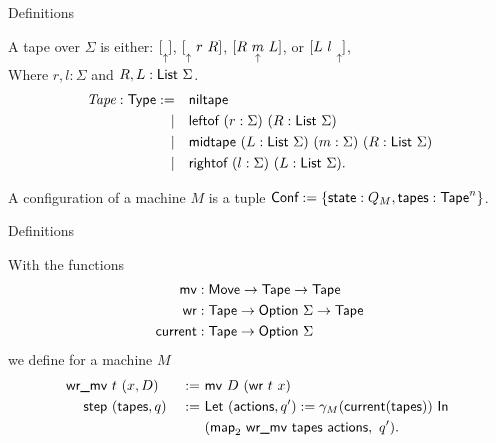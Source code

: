 \begin{frame}{Definitions}
  \begin{definition}[Tape]
    A tape over $\Sigma$ is either:
    $ [ \underset{\uparrow}{} ]$, $[ \underset{\uparrow}{}~r~R ]$, $[ R~\underset{\uparrow}{m}~L ]$, or $[ L~l~\underset{\uparrow}{} ]$,\\
    Where $r,l : \Sigma$ and $R,L : \textsf{List}~\Sigma$.
    \pause
    \begin{alignat*}{2}
      \emph{Tape}:\textsf{Type} := \quad & \textsf{niltape} \\
      | \quad & \textsf{leftof}  ~ (r:\Sigma) ~ (R:\textsf{List}~\Sigma) \\
      | \quad & \textsf{midtape} ~ (L:\textsf{List}~\Sigma) ~ (m:\Sigma) ~ (R:\textsf{List}~\Sigma) \\
      | \quad & \textsf{rightof} ~ (l:\Sigma) ~ (L:\textsf{List}~\Sigma).
    \end{alignat*}
  \end{definition}
  \pause
  \begin{definition}[Configuration]
    A configuration of a machine $M$ is a tuple $\textsf{Conf} := \{\textsf{state}:Q_M, \textsf{tapes}:\textsf{Tape}^n\}$.
  \end{definition}
\end{frame}

\begin{frame}{Definitions}
  \begin{definition}
    With the functions
    \begin{alignat*}{2}
      \textsf{mv}      & : \textsf{Move} \rightarrow \textsf{Tape} \rightarrow \textsf{Tape} \\
      \textsf{wr}      & : \textsf{Tape} \rightarrow \textsf{Option}~\Sigma \rightarrow \textsf{Tape} \\
      \textsf{current} & : \textsf{Tape} \rightarrow \textsf{Option}~\Sigma
    \end{alignat*}
    we define for a machine $M$
    \begin{alignat*}{2}
      \textsf{wr\_mv}&~t~(x, D)      &~:=~& \textsf{mv}~D~(\textsf{wr}~t~x) \\
      \textsf{step}&~(\textsf{tapes}, q) &~:=~& \textsf{Let}~(\textsf{actions}, q') := \gamma_M(\textsf{current}(\textsf{tapes}))~\textsf{In}~ \\
               &                 &~  ~& (\textsf{map}_2~\textsf{wr\_mv}~\textsf{tapes}~\textsf{actions},~ q').
      \end{alignat*}
  \end{definition}
\end{frame}

